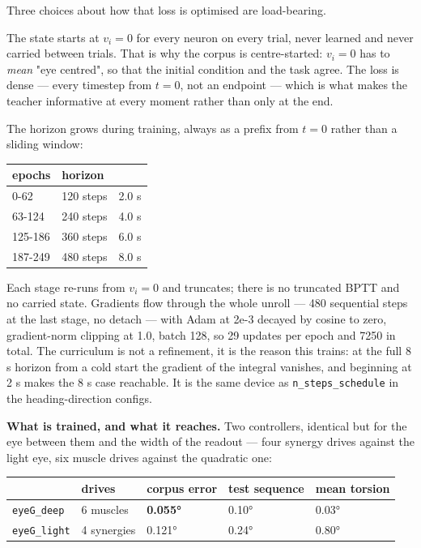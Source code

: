 \documentclass[10pt]{article}
\begin{document}
Three choices about how that loss is optimised are load-bearing.

The state starts at $v_i = 0$ for every neuron on every trial, never learned and never
carried between trials. That is why the corpus is centre-started: $v_i = 0$ has to
\emph{mean} "eye centred", so that the initial condition and the task agree. The loss is
dense --- every timestep from $t=0$, not an endpoint --- which is what makes the teacher
informative at every moment rather than only at the end.

The horizon grows during training, always as a prefix from $t=0$ rather than a sliding
window:

\begin{center}\small
\begin{tabular}{lll}\toprule
epochs & horizon &  \\\midrule
0-62 & 120 steps & 2.0 s \\
63-124 & 240 steps & 4.0 s \\
125-186 & 360 steps & 6.0 s \\
187-249 & 480 steps & 8.0 s \\
\bottomrule\end{tabular}\end{center}

Each stage re-runs from $v_i = 0$ and truncates; there is no truncated BPTT and no carried
state. Gradients flow through the whole unroll --- 480 sequential steps at the last stage,
no detach --- with Adam at 2e-3 decayed by cosine to zero, gradient-norm clipping at 1.0,
batch 128, so 29 updates per epoch and 7250 in total. The curriculum is not a refinement, it
is the reason this trains: at the full 8 s horizon from a cold start the gradient of the
integral vanishes, and beginning at 2 s makes the 8 s case reachable. It is the same device
as \texttt{n\_steps\_schedule} in the heading-direction configs.

\textbf{What is trained, and what it reaches.} Two controllers, identical but for the eye
between them and the width of the readout --- four synergy drives against the light eye, six
muscle drives against the quadratic one:

\begin{center}\small
\begin{tabular}{lllll}\toprule
 & drives & corpus error & test sequence & mean torsion \\\midrule
\texttt{eyeG\_deep} & 6 muscles & \textbf{0.055°} & 0.10° & 0.03° \\
\texttt{eyeG\_light} & 4 synergies & 0.121° & 0.24° & 0.80° \\
\bottomrule\end{tabular}\end{center}
\end{document}
